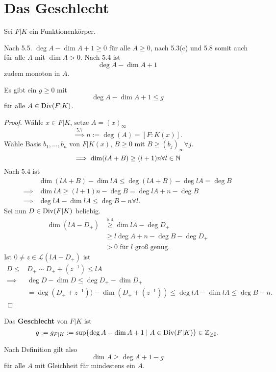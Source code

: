 \section{Das Geschlecht}
Sei $F|K$ ein Funktionenkörper.

\begin{bemerkungnr}
    Nach 5.5. $ \deg A - \dim A + 1 \geq 0$ für alle $A \geq 0$, nach 5.3(c) und 5.8 somit auch für alle
    $A$ mit $\dim A > 0$. Nach 5.4 ist 
    $$ \deg A - \dim A +1 $$
    zudem monoton in $A$.
\end{bemerkungnr}

\begin{satz}
    Es gibt ein $g \geq 0$ mit
    $$ \deg A - \dim A + 1 \leq g$$
    für alle $A \in \operatorname{Div}(F|K)$.
\end{satz}
\begin{proof}
    Wähle $x \in F|K$, setze $A = (x)_\infty$
    $$ \stackrel{5.7}{\implies} n := \deg (A) = [F : K(x)].$$
    Wähle Basis $b_1,\ldots,b_n$ von $F|K(x)$, $B \geq 0$ mit $B \geq (b_j)_\infty \forall j$.
    $$ \implies \dim (lA + B) \geq (l+1)n \forall l \in \mathbb{N}$$
    Nach 5.4 ist 
    \begin{align*}
        &\dim (lA+B) - \dim lA \leq \deg (lA + B) - \deg lA = \deg B\\
        \implies& \dim lA \geq (l+1)n - \deg B = \deg lA + n - \deg B\\
        \implies& \deg lA - \dim lA \leq \deg B - n \forall l.
    \end{align*}
    Sei nun $D \in \operatorname{Div}(F|K)$ beliebig.
    \begin{align*}
        \dim (lA - D_+) &\stackrel{5.4}{\geq} \dim lA - \deg D_+\\
        & \geq l \deg A + n - \deg B - \deg D_+\\
        &> 0 \text{ für } l \text{ groß genug.}
    \end{align*}
    Ist $0 \ne z \in \mathcal{L}(lA - D_+)$ ist
    \begin{align*}
        D \leq& D_+ \sim D_+ + (z^{-1}) \leq lA \\
        \implies& \deg D - \dim D \leq \deg D_+ - \dim D_+\\
        &= \deg (D_+ + z^{-1})) - \dim (D_+ + (z^{-1})) \leq \deg lA - \dim lA \leq \deg B -n.
    \end{align*}
\end{proof}

\begin{definition}
    Das \textbf{Geschlecht} von $F|K$ ist
    $$ g := g_{F|K} := \sup \{\deg A - \dim A + 1 \mid A \in \operatorname{Div}(F|K)\} \in \mathbb{Z}_{\geq 0}.$$
\end{definition}

\begin{bemerkungnr}
    Nach Definition gilt also 
    $$ \dim A \geq \deg A + 1 -g $$
    für alle $A$ mit Gleichheit für mindestens ein $A$.
\end{bemerkungnr}
